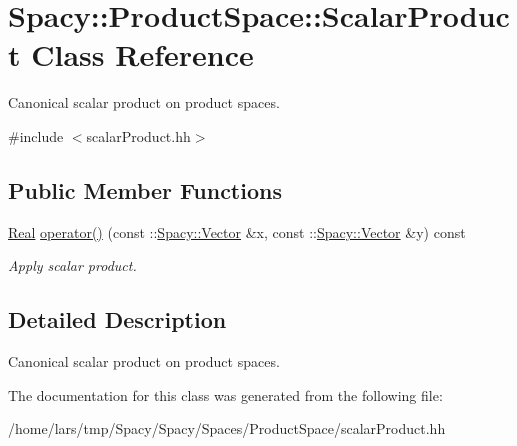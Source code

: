 \hypertarget{classSpacy_1_1ProductSpace_1_1ScalarProduct}{}\section{Spacy\+:\+:Product\+Space\+:\+:Scalar\+Product Class Reference}
\label{classSpacy_1_1ProductSpace_1_1ScalarProduct}


Canonical scalar product on product spaces.  




{\ttfamily \#include $<$scalar\+Product.\+hh$>$}

\subsection*{Public Member Functions}
\begin{DoxyCompactItemize}
\item 
\hyperlink{classSpacy_1_1Real}{Real} \hyperlink{classSpacy_1_1ProductSpace_1_1ScalarProduct_a71a7e705455d1005c7611a259346c0c2}{operator()} (const \+::\hyperlink{classSpacy_1_1Vector}{Spacy\+::\+Vector} \&x, const \+::\hyperlink{classSpacy_1_1Vector}{Spacy\+::\+Vector} \&y) const \hypertarget{classSpacy_1_1ProductSpace_1_1ScalarProduct_a71a7e705455d1005c7611a259346c0c2}{}\label{classSpacy_1_1ProductSpace_1_1ScalarProduct_a71a7e705455d1005c7611a259346c0c2}

\begin{DoxyCompactList}\small\item\em Apply scalar product. \end{DoxyCompactList}\end{DoxyCompactItemize}


\subsection{Detailed Description}
Canonical scalar product on product spaces. 

The documentation for this class was generated from the following file\+:\begin{DoxyCompactItemize}
\item 
/home/lars/tmp/\+Spacy/\+Spacy/\+Spaces/\+Product\+Space/scalar\+Product.\+hh\end{DoxyCompactItemize}
